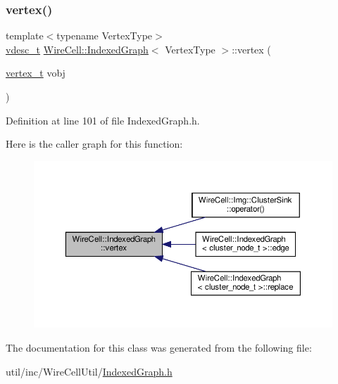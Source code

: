\mbox{\label{class_wire_cell_1_1_indexed_graph_a80546c5d1dee591fae4c845de560f806}} 
\subsubsection{\texorpdfstring{vertex()}{vertex()}}
{\footnotesize\ttfamily template$<$typename Vertex\+Type$>$ \\
\hyperlink{class_wire_cell_1_1_indexed_graph_a8bad4d4e6f2d8a8109e95757d502c9ba}{vdesc\+\_\+t} \hyperlink{class_wire_cell_1_1_indexed_graph}{Wire\+Cell\+::\+Indexed\+Graph}$<$ Vertex\+Type $>$\+::vertex (\begin{DoxyParamCaption}\item[{\hyperlink{class_wire_cell_1_1_indexed_graph_ac26b25ac103373dde929a982d948d1b5}{vertex\+\_\+t}}]{vobj }\end{DoxyParamCaption})\hspace{0.3cm}{\ttfamily [inline]}}



Definition at line 101 of file Indexed\+Graph.\+h.

Here is the caller graph for this function\+:
\nopagebreak
\begin{figure}[H]
\begin{center}
\leavevmode
\includegraphics[width=350pt]{class_wire_cell_1_1_indexed_graph_a80546c5d1dee591fae4c845de560f806_icgraph}
\end{center}
\end{figure}


The documentation for this class was generated from the following file\+:\begin{DoxyCompactItemize}
\item 
util/inc/\+Wire\+Cell\+Util/\hyperlink{_indexed_graph_8h}{Indexed\+Graph.\+h}\end{DoxyCompactItemize}

